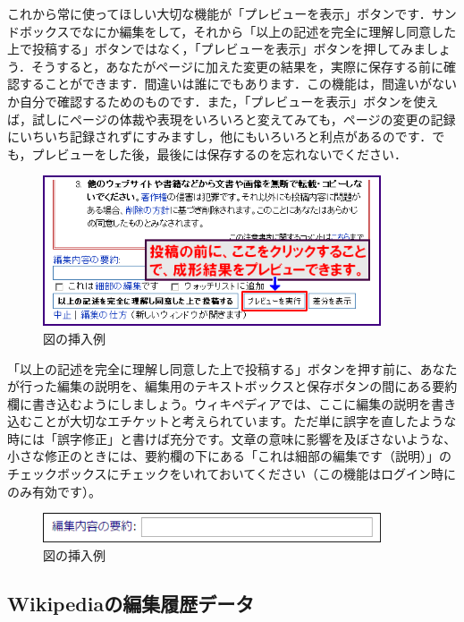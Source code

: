 これから常に使ってほしい大切な機能が「プレビューを表示」ボタンです．サンドボックスでなにか編集をして，それから「以上の記述を完全に理解し同意した上で投稿する」ボタンではなく，「プレビューを表示」ボタンを押してみましょう．そうすると，あなたがページに加えた変更の結果を，実際に保存する前に確認することができます．間違いは誰にでもあります．この機能は，間違いがないか自分で確認するためのものです．また，「プレビューを表示」ボタンを使えば，試しにページの体裁や表現をいろいろと変えてみても，ページの変更の記録にいちいち記録されずにすみますし，他にもいろいろと利点があるのです．でも，プレビューをした後，最後には保存するのを忘れないでください．

\begin{figure}[htb]
\centering
\includegraphics[width=10cm]{sample2.png}
\caption{図の挿入例}\label{サンプル図}
\end{figure}

「以上の記述を完全に理解し同意した上で投稿する」ボタンを押す前に、あなたが行った編集の説明を、編集用のテキストボックスと保存ボタンの間にある要約欄に書き込むようにしましょう。ウィキペディアでは、ここに編集の説明を書き込むことが大切なエチケットと考えられています。ただ単に誤字を直したような時には「誤字修正」と書けば充分です。文章の意味に影響を及ぼさないような、小さな修正のときには、要約欄の下にある「これは細部の編集です（説明）」のチェックボックスにチェックをいれておいてください（この機能はログイン時にのみ有効です）。

\begin{figure}[htb]
\centering
\includegraphics[width=10cm]{sample3.png}
\caption{図の挿入例}\label{サンプル図}
\end{figure}

\subsection{Wikipediaの編集履歴データ}

